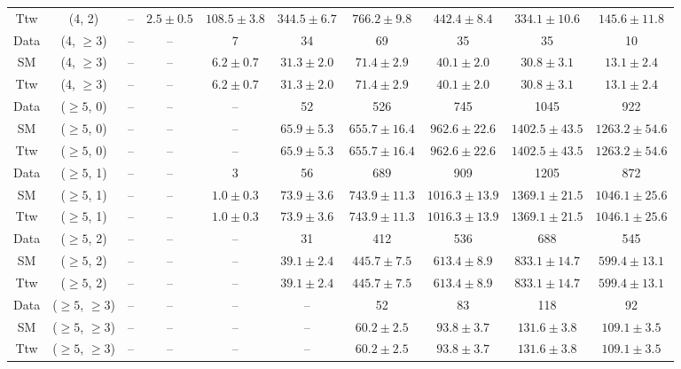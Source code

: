\begin{table}[h!]
{\begin{tabular}{cccccccccc}
	Ttw & (4, 2) & -- & $2.5\pm 0.5$ & $108.5\pm 3.8$ & $344.5\pm 6.7$ & $766.2\pm 9.8$ & $442.4\pm 8.4$ & $334.1\pm 10.6$ & $145.6\pm 11.8$ \\[0.5ex] 
	Data & (4, $\ge3$) & -- & -- & 7 & 34 & 69 & 35 & 35 & 10 \\[0.5ex] 
	SM & (4, $\ge3$) & -- & -- & $6.2\pm 0.7$ & $31.3\pm 2.0$ & $71.4\pm 2.9$ & $40.1\pm 2.0$ & $30.8\pm 3.1$ & $13.1\pm 2.4$ \\[0.5ex] 
	Ttw & (4, $\ge3$) & -- & -- & $6.2\pm 0.7$ & $31.3\pm 2.0$ & $71.4\pm 2.9$ & $40.1\pm 2.0$ & $30.8\pm 3.1$ & $13.1\pm 2.4$ \\[0.5ex] 
	Data & ($\ge5$, 0) & -- & -- & -- & 52 & 526 & 745 & 1045 & 922 \\[0.5ex] 
	SM & ($\ge5$, 0) & -- & -- & -- & $65.9\pm 5.3$ & $655.7\pm 16.4$ & $962.6\pm 22.6$ & $1402.5\pm 43.5$ & $1263.2\pm 54.6$ \\[0.5ex] 
	Ttw & ($\ge5$, 0) & -- & -- & -- & $65.9\pm 5.3$ & $655.7\pm 16.4$ & $962.6\pm 22.6$ & $1402.5\pm 43.5$ & $1263.2\pm 54.6$ \\[0.5ex] 
	Data & ($\ge5$, 1) & -- & -- & 3 & 56 & 689 & 909 & 1205 & 872 \\[0.5ex] 
	SM & ($\ge5$, 1) & -- & -- & $1.0\pm 0.3$ & $73.9\pm 3.6$ & $743.9\pm 11.3$ & $1016.3\pm 13.9$ & $1369.1\pm 21.5$ & $1046.1\pm 25.6$ \\[0.5ex] 
	Ttw & ($\ge5$, 1) & -- & -- & $1.0\pm 0.3$ & $73.9\pm 3.6$ & $743.9\pm 11.3$ & $1016.3\pm 13.9$ & $1369.1\pm 21.5$ & $1046.1\pm 25.6$ \\[0.5ex] 
	Data & ($\ge5$, 2) & -- & -- & -- & 31 & 412 & 536 & 688 & 545 \\[0.5ex] 
	SM & ($\ge5$, 2) & -- & -- & -- & $39.1\pm 2.4$ & $445.7\pm 7.5$ & $613.4\pm 8.9$ & $833.1\pm 14.7$ & $599.4\pm 13.1$ \\[0.5ex] 
	Ttw & ($\ge5$, 2) & -- & -- & -- & $39.1\pm 2.4$ & $445.7\pm 7.5$ & $613.4\pm 8.9$ & $833.1\pm 14.7$ & $599.4\pm 13.1$ \\[0.5ex] 
	Data & ($\ge5$, $\ge3$) & -- & -- & -- & -- & 52 & 83 & 118 & 92 \\[0.5ex] 
	SM & ($\ge5$, $\ge3$) & -- & -- & -- & -- & $60.2\pm 2.5$ & $93.8\pm 3.7$ & $131.6\pm 3.8$ & $109.1\pm 3.5$ \\[0.5ex] 
	Ttw & ($\ge5$, $\ge3$) & -- & -- & -- & -- & $60.2\pm 2.5$ & $93.8\pm 3.7$ & $131.6\pm 3.8$ & $109.1\pm 3.5$ \\[0.5ex] 
	\hline
	\hline
\end{tabular}}
\end{table}
